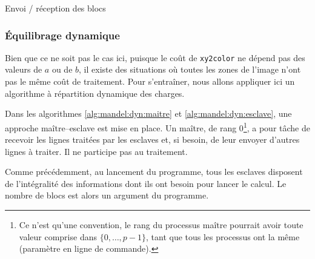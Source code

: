 \begin{algorithm*}
  \caption{Envoi / réception des blocs}
  \label{alg:mandel:stat:envoi}
  \Donnees{\W, \Rank, \Hlocal, \Ima, \Pima}

\end{algorithm*}


\subsubsection{Équilibrage dynamique}

Bien que ce ne soit pas le cas ici, puisque le coût de
\texttt{xy2color} ne dépend pas des valeurs de $a$ ou de $b$, il
existe des situations où toutes les zones de l'image n'ont pas le même
coût de traitement. Pour s'entraîner, nous allons appliquer ici un
algorithme à répartition dynamique des charges.

Dans les algorithmes \ref{alg:mandel:dyn:maitre} et
\ref{alg:mandel:dyn:esclave}, une approche maître--esclave est mise en
place. Un maître, de rang 0\footnote{Ce n'est qu'une convention, le
  rang du processus maître pourrait avoir toute valeur comprise dans
  $\{0, \ldots, p-1\}$, tant que tous les processus ont la même
  (paramètre en ligne de commande).}, a pour tâche de recevoir les
lignes traitées par les esclaves et, si besoin, de leur envoyer
d'autres lignes à traiter. Il ne participe pas au traitement.

Comme précédemment, au lancement du programme, tous les esclaves
disposent de l'intégralité des informations dont ils ont besoin pour
lancer le calcul. Le nombre de blocs est alors un argument du
programme.


